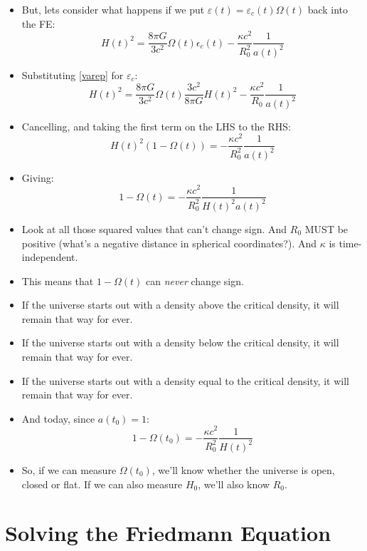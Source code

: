 \documentclass[11pt]{article}
\begin{document}
\begin{itemize}
\item But, lets consider what happens if we put $\varepsilon(t)=\varepsilon_c(t)\Omega(t)$ back into the FE:
\begin{equation}
H(t)^2 = \frac{8\pi G}{3c^2}\Omega(t)\epsilon_c(t)-\frac{\kappa c^2}{R_0^2}\frac{1}{a(t)^2}
\end{equation}
\item Substituting \ref{varep} for $\varepsilon_c$:
\begin{equation}
    H(t)^2 = \frac{8\pi G}{3c^2}\Omega(t)\frac{3c^2}{8\pi G}H(t)^2-\frac{\kappa c^2}{R_0}\frac{1}{a(t)^2}
\end{equation}
\item Cancelling, and taking the first term on the LHS to the RHS:
\begin{equation}
    H(t)^2 (1 - \Omega(t)) = -\frac{\kappa c^2}{R_0^2}\frac{1}{a(t)^2}
\end{equation}
\item Giving:
\begin{equation}
    1 - \Omega(t) = -\frac{\kappa c^2}{R_0^2}\frac{1}{H(t)^2a(t)^2}
\end{equation}
\item Look at all those squared values that can't change sign. And $R_0$ MUST be positive (what's a negative distance in spherical coordinates?). And $\kappa$ is time-independent.
\item This means that $1-\Omega(t)$ can {\it never} change sign.
\item If the universe starts out with a density above the critical density, it will remain that way for ever.
\item If the universe starts out with a density below the critical density, it will remain that way for ever.
\item If the universe starts out with a density equal to the critical density, it will remain that way for ever.
\item And today, since $a(t_0)=1$:
\begin{equation}
    1 - \Omega(t_0) = -\frac{\kappa c^2}{R_0^2}\frac{1}{H(t)^2}
\end{equation}
\item So, if we can measure $\Omega(t_0)$, we'll know whether the universe is open, closed or flat. If we can also measure $H_0$, we'll also know $R_0$.

\end{itemize}

\section{Solving the Friedmann Equation}
\end{document}
